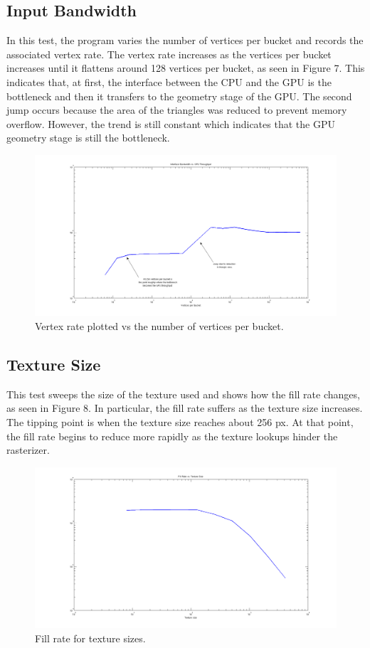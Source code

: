\documentclass[12pt] {article}
\begin{document}
\subsection{Input Bandwidth}
In this test, the program varies the number of vertices per bucket and records the associated vertex rate. The vertex rate increases as the vertices per bucket increases until it flattens around 128 vertices per bucket, as seen in Figure 7. This indicates that, at first, the interface between the CPU and the GPU is the bottleneck and then it transfers to the geometry stage of the GPU. The second jump occurs because the area of the triangles was reduced to prevent memory overflow. However, the trend is still constant which indicates that the GPU geometry stage is still the bottleneck.
\begin{figure}[ht!]
	\centering
	\includegraphics[width=5in]{figures/results3-interface-vs-GPU.png}
	\caption{Vertex rate plotted vs the number of vertices per bucket.}
\end{figure}
\FloatBarrier

\newpage
\subsection{Texture Size}
This test sweeps the size of the texture used and shows how the fill rate changes, as seen in Figure 8. In particular, the fill rate suffers as the texture size increases. The tipping point is when the texture size reaches about 256 px. At that point, the fill rate begins to reduce more rapidly as the texture lookups hinder the rasterizer.
\begin{figure}[ht!]
	\centering
	\includegraphics[width=5in]{figures/results4-fill-rate-vs-texture.png}
	\caption{Fill rate for texture sizes.}
\end{figure}
\FloatBarrier
\end{document}
